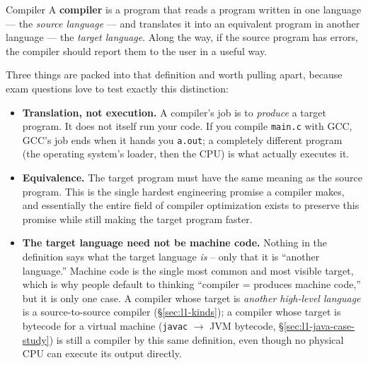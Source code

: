\documentclass[full-course-notes.tex]{subfiles}
\begin{document}
\begin{defbox}{Compiler}
A \textbf{compiler} is a program that reads a program written in one language --- the
\emph{source language} --- and translates it into an equivalent program in another language ---
the \emph{target language}. Along the way, if the source program has errors, the compiler
should report them to the user in a useful way.
\end{defbox}

Three things are packed into that definition and worth pulling apart, because exam questions
love to test exactly this distinction:

\begin{itemize}
  \item \textbf{Translation, not execution.} A compiler's job is to \emph{produce} a target
  program. It does not itself run your code. If you compile \texttt{main.c} with GCC, GCC's job
  ends when it hands you \texttt{a.out}; a completely different program (the operating system's
  loader, then the CPU) is what actually executes it.
  \item \textbf{Equivalence.} The target program must have the same meaning as the source
  program. This is the single hardest engineering promise a compiler makes, and essentially the
  entire field of compiler optimization exists to preserve this promise while still making the
  target program faster.
  \item \textbf{The target language need not be machine code.} Nothing in the definition says
  what the target language \emph{is} -- only that it is ``another language.'' Machine code is
  the single most common and most visible target, which is why people default to thinking
  ``compiler = produces machine code,'' but it is only one case. A compiler whose target is
  \emph{another high-level language} is a source-to-source compiler (\S\ref{sec:l1-kinds}); a
  compiler whose target is bytecode for a virtual machine (\texttt{javac} $\to$ JVM bytecode,
  \S\ref{sec:l1-java-case-study}) is still a compiler by this same definition, even though no
  physical CPU can execute its output directly.
\end{itemize}

\begin{center}
\end{center}
\end{document}

